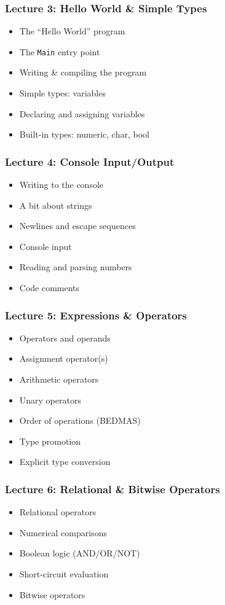 \begin{frame}
\frametitle{Lecture 3: Hello World \& Simple Types}

{\Large
\begin{itemize}
	\item The ``Hello World'' program
	\item The \texttt{Main} entry point
	\item Writing \& compiling the program
	\item Simple types: variables
	\item Declaring and assigning variables
	\item Built-in types: numeric, char, bool
\end{itemize}
}

\end{frame}


\begin{frame}
\frametitle{Lecture 4: Console Input/Output}

{\Large
\begin{itemize}
	\item Writing to the console
	\item A bit about strings
	\item Newlines and escape sequences
	\item Console input
	\item Reading and parsing numbers
	\item Code comments
\end{itemize}
}

\end{frame}


\begin{frame}
\frametitle{Lecture 5: Expressions \& Operators}

{\Large
\begin{itemize}
	\item Operators and operands
	\item Assignment operator(s)
	\item Arithmetic operators
	\item Unary operators
	\item Order of operations (BEDMAS)
	\item Type promotion
	\item Explicit type conversion
\end{itemize}
}

\end{frame}



\begin{frame}
\frametitle{Lecture 6: Relational \& Bitwise Operators}

{\Large
\begin{itemize}
	\item Relational operators
	\item Numerical comparisons
	\item Boolean logic (AND/OR/NOT)
	\item Short-circuit evaluation
	\item Bitwise operators
\end{itemize}
}

\end{frame}



